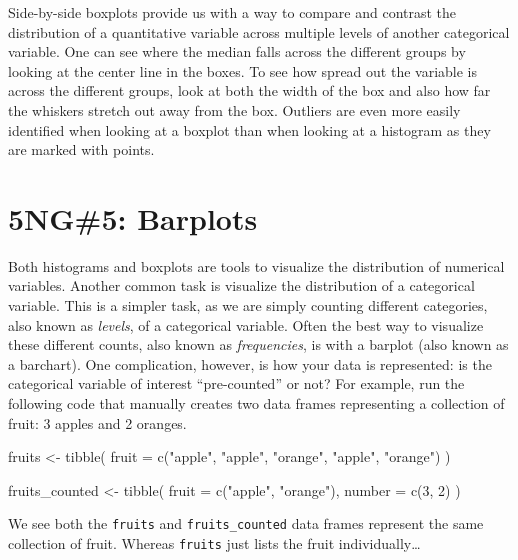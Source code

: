 \documentclass[
  letterpaper,
  DIV=11,
  numbers=noendperiod]{scrreprt}
\newenvironment{Shaded}{\begin{snugshade}}{\end{snugshade}}
\newcommand{\AttributeTok}[1]{\textcolor[rgb]{0.40,0.45,0.13}{#1}}
\newcommand{\DecValTok}[1]{\textcolor[rgb]{0.68,0.00,0.00}{#1}}
\newcommand{\FunctionTok}[1]{\textcolor[rgb]{0.28,0.35,0.67}{#1}}
\newcommand{\NormalTok}[1]{\textcolor[rgb]{0.00,0.23,0.31}{#1}}
\newcommand{\OtherTok}[1]{\textcolor[rgb]{0.00,0.23,0.31}{#1}}
\newcommand{\StringTok}[1]{\textcolor[rgb]{0.13,0.47,0.30}{#1}}
\theoremstyle{definition}
\theoremstyle{remark}
\begin{document}
Side-by-side boxplots provide us with a way to compare and contrast the
distribution of a quantitative variable across multiple levels of
another categorical variable. One can see where the median falls across
the different groups by looking at the center line in the boxes. To see
how spread out the variable is across the different groups, look at both
the width of the box and also how far the whiskers stretch out away from
the box. Outliers are even more easily identified when looking at a
boxplot than when looking at a histogram as they are marked with points.

\hypertarget{sec-geombar}{%
\section{5NG\#5: Barplots}\label{sec-geombar}}

Both histograms and boxplots are tools to visualize the distribution of
numerical variables. Another common task is visualize the distribution
of a categorical variable. This is a simpler task, as we are simply
counting different categories, also known as \emph{levels}, of a
categorical variable. Often the best way to visualize these different
counts, also known as \emph{frequencies}, is with a barplot (also known
as a barchart). One complication, however, is how your data is
represented: is the categorical variable of interest ``pre-counted'' or
not? For example, run the following code that manually creates two data
frames representing a collection of fruit: 3 apples and 2 oranges.

\begin{Shaded}
\begin{Highlighting}[]
\NormalTok{fruits }\OtherTok{\textless{}{-}} \FunctionTok{tibble}\NormalTok{(}
  \AttributeTok{fruit =} \FunctionTok{c}\NormalTok{(}\StringTok{"apple"}\NormalTok{, }\StringTok{"apple"}\NormalTok{, }\StringTok{"orange"}\NormalTok{, }\StringTok{"apple"}\NormalTok{, }\StringTok{"orange"}\NormalTok{)}
\NormalTok{  )}

\NormalTok{fruits\_counted }\OtherTok{\textless{}{-}} \FunctionTok{tibble}\NormalTok{(}
  \AttributeTok{fruit =} \FunctionTok{c}\NormalTok{(}\StringTok{"apple"}\NormalTok{, }\StringTok{"orange"}\NormalTok{),}
  \AttributeTok{number =} \FunctionTok{c}\NormalTok{(}\DecValTok{3}\NormalTok{, }\DecValTok{2}\NormalTok{)}
\NormalTok{  )}
\end{Highlighting}
\end{Shaded}

We see both the \texttt{fruits} and \texttt{fruits\_counted} data frames
represent the same collection of fruit. Whereas \texttt{fruits} just
lists the fruit individually\ldots{}
\end{document}
